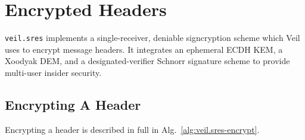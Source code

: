 \section{Encrypted Headers}\label{sec:veil.sres}

\texttt{veil.sres} implements a single-receiver, deniable signcryption scheme which Veil uses to encrypt message
headers.
It integrates an ephemeral ECDH KEM, a Xoodyak DEM, and a designated-verifier Schnorr signature scheme to provide
multi-user insider security.

\subsection{Encrypting A Header}\label{subsec:veil.sres-encrypt}

Encrypting a header is described in full in Alg.~\ref{alg:veil.sres-encrypt}.

